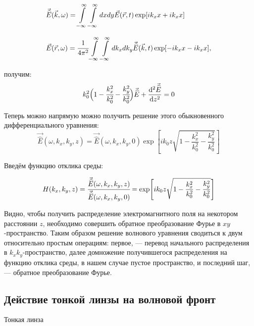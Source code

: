 \documentclass[14pt,a4paper]{extarticle}
\numberwithin{equation}{section}
\begin{document}
\begin{equation}
	\label{eq:Fourier_rk}
		\begin{array}{lcl}
		\vec{\widehat{E}}(\vec{k}, \omega) = \displaystyle\int\limits_{-\infty}^{\infty}\int\limits_{-\infty}^{\infty} dxdy \vec{E}(\vec{r}, t)\exp[ik_xx + ik_xx]\\
		\\
		\vec{E}(\vec{r}, \omega) = \cfrac{1}{4\pi^2}\displaystyle\int\limits_{-\infty}^{\infty}\int\limits_{-\infty}^{\infty} dk_xdk_y \vec{\widehat{E}}(\vec{k}, t)\exp[-ik_xx - ik_xx],
	\end{array}
\end{equation}

получим: 
\begin{equation}
	k_0^2\Big(1 - \cfrac{k^2_x}{k^2_0} - \cfrac{k^2_y}{k^2_0} \Big)\vec{\widehat{E}} + \dv[2]{\vec{\widehat{E}}}{z} = 0
\end{equation}

Теперь можно напрямую можно получить решение этого обыкновенного дифференциального уравнения:
\begin{equation}
	\vec{\widehat{E}}(\omega, k_x, k_y, z) = \vec{\widehat{E}}(\omega, k_x, k_y, 0)\exp[ik_0z\sqrt{1 - \frac{k^2_x}{k^2_0} - \frac{k^2_y}{k^2_0}} ]
\end{equation}

Введём функцию отклика среды:

\begin{equation}
	H(k_x, k_y, z) = \cfrac{\vec{\widehat{E}}(\omega, k_x, k_y, z)}{\vec{\widehat{E}}(\omega, k_x, k_y, 0)} = \exp[ik_0z\sqrt{1 - \frac{k^2_x}{k^2_0} - \frac{k^2_y}{k^2_0}} ]
\end{equation}
 
Видно, чтобы получить распределение электромагнитного поля на некотором расстоянии $z$, необходимо совершить обратное преобразование Фурье в $xy$-пространство. Таким образом решение волнового уравнения сводиться к двум относительно простым операциям: первое, --- перевод начального распределения в $k_xk_y$-пространство, далее домножение получившегося распределения на функцию отклика среды, в нашем случае пустое пространство, и последний шаг, --- обратное преобразование Фурье. 

\subsection{Действие тонкой линзы на волновой фронт}
Тонкая линза 
\end{document}

